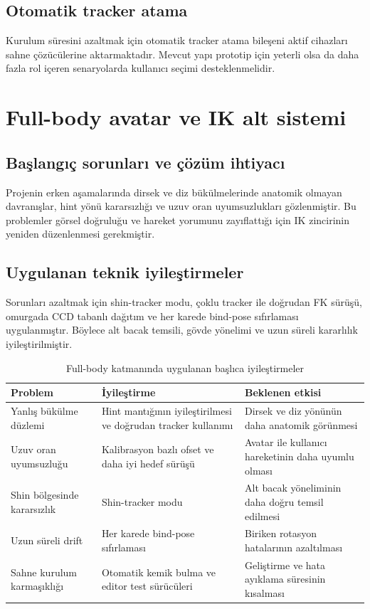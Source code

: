 \documentclass[12pt,a4paper,oneside]{report}
\begin{document}
\subsection{Otomatik tracker atama}
Kurulum süresini azaltmak için otomatik tracker atama bileşeni aktif cihazları sahne çözücülerine aktarmaktadır. Mevcut yapı prototip için yeterli olsa da daha fazla rol içeren senaryolarda kullanıcı seçimi desteklenmelidir.

\section{Full-body avatar ve IK alt sistemi}

\subsection{Başlangıç sorunları ve çözüm ihtiyacı}
Projenin erken aşamalarında dirsek ve diz bükülmelerinde anatomik olmayan davranışlar, hint yönü kararsızlığı ve uzuv oran uyumsuzlukları gözlenmiştir. Bu problemler görsel doğruluğu ve hareket yorumunu zayıflattığı için IK zincirinin yeniden düzenlenmesi gerekmiştir.

\subsection{Uygulanan teknik iyileştirmeler}
Sorunları azaltmak için shin-tracker modu, çoklu tracker ile doğrudan FK sürüşü, omurgada CCD tabanlı dağıtım ve her karede bind-pose sıfırlaması uygulanmıştır. Böylece alt bacak temsili, gövde yönelimi ve uzun süreli kararlılık iyileştirilmiştir.

\begin{table}[H]
\centering
\caption{Full-body katmanında uygulanan başlıca iyileştirmeler}
\label{tab:iyilestirmeler}
\renewcommand{\arraystretch}{1.2}
\begin{tabularx}{\textwidth}{L{4cm}L{4cm}Y}
\toprule
\textbf{Problem} & \textbf{İyileştirme} & \textbf{Beklenen etkisi} \\
\midrule
Yanlış bükülme düzlemi & Hint mantığının iyileştirilmesi ve doğrudan tracker kullanımı & Dirsek ve diz yönünün daha anatomik görünmesi \\
Uzuv oran uyumsuzluğu & Kalibrasyon bazlı ofset ve daha iyi hedef sürüşü & Avatar ile kullanıcı hareketinin daha uyumlu olması \\
Shin bölgesinde kararsızlık & Shin-tracker modu & Alt bacak yöneliminin daha doğru temsil edilmesi \\
Uzun süreli drift & Her karede bind-pose sıfırlaması & Biriken rotasyon hatalarının azaltılması \\
Sahne kurulum karmaşıklığı & Otomatik kemik bulma ve editor test sürücüleri & Geliştirme ve hata ayıklama süresinin kısalması \\
\bottomrule
\end{tabularx}
\end{table}
\end{document}
